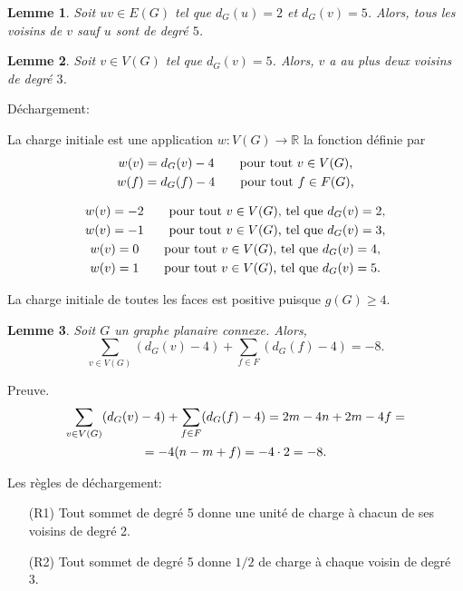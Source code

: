 \documentclass{beamer}
\newtheorem{lemme}{Lemme}
\begin{document}
\begin{frame}
\begin{lemme}
Soit $uv \in E(G)$ tel que $d_G(u) = 2$ et $d_G(v) = 5$. Alors, tous les voisins de $v$ sauf $u$ sont de degré $5$. 
\label{le:254}
\end{lemme}
\end{frame}

\begin{frame}
\begin{lemme}
Soit $v \in V(G)$ tel que $d_G(v) = 5$. Alors, $v$ a au plus deux voisins de degré $3$.
\label{le:5333}
\end{lemme}
\end{frame}

\begin{frame}
Déchargement:

La charge initiale est une application  $w: V(G) \to \mathbb{R}$  la fonction définie par
 $$
 \gathered
 w(v) = d_G(v) - 4 \qquad \textrm{pour tout $v\in V(G)$,} \\
 w(f) = d_G(f) - 4 \qquad \textrm{pour tout $f\in F(G)$,} 
\endgathered 
$$

$$ 
\gathered
w(v) = -2 \qquad \textrm{pour tout $v \in V(G)$, tel que } d_G(v) = 2, \\
w(v) = -1 \qquad \textrm{pour tout $v \in V(G)$, tel que } d_G(v) = 3, \\
w(v) =  0 \qquad \textrm{pour tout $v \in V(G)$, tel que } d_G(v) = 4, \\
w(v) =  1 \qquad \textrm{pour tout $v \in V(G)$, tel que } d_G(v) = 5.
\endgathered
$$

La charge initiale de toutes les faces est positive puisque $g(G)\ge 4$.
\end{frame}

\begin{frame}
\begin{lemme}
Soit $G$ un graphe planaire connexe. Alors,
$$ \sum_{v \in V(G)} (d_G(v) - 4) + \sum_{f\in F} (d_G(f) -4) = -8.$$
\label{le:charge}
\end{lemme}
Preuve.
$$
\gathered 
\sum_{v \in V(G)} (d_G(v) - 4) + \sum_{f\in F} (d_G(f) -4) = 2m -4n + 2m - 4f = \\
 =-4(n - m + f) = -4\cdot 2 = -8.
\endgathered
$$
\end{frame}

\begin{frame}
Les règles de déchargement:
\begin{enumerate}
\item[(R1)] Tout sommet de degré 5 donne une unité de charge à chacun de ses voisins de degré 2.
\item[(R2)] Tout sommet de degré 5 donne $1/2$ de charge à chaque voisin de degré 3.
\end{enumerate}
\end{frame}
\end{document}
